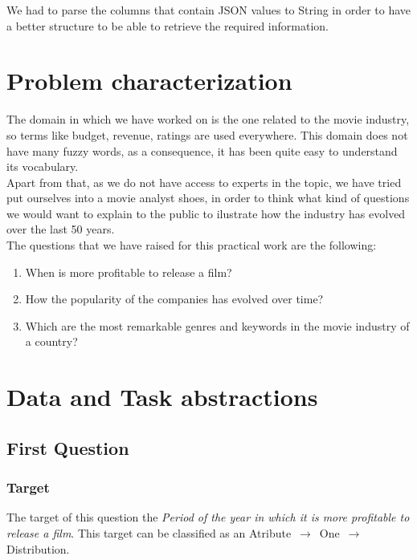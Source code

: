 We had to parse the columns that contain JSON values to String in order to have a better structure to be able to retrieve the required information.

\section{Problem characterization}

The domain in which we have worked on is the one related to the movie industry, so terms like budget, revenue, ratings are used everywhere. This domain does not have many fuzzy words, as a consequence, it has been quite easy to understand its vocabulary.\\

Apart from that, as we do not have access to experts in the topic, we have tried put ourselves into a movie analyst shoes, in order to think what kind of questions we would want to explain to the public to ilustrate how the industry has evolved over the last 50 years.\\

The questions that we have raised for this practical work are the following:

\begin{enumerate}
	\item When is more profitable to release a film?
	\item How the popularity of the companies has evolved over time?
	\item Which are the most remarkable genres and keywords in the movie industry of a country?
\end{enumerate}

\section{Data and Task abstractions}

\subsection{First Question}

\subsubsection{Target}
The target of this question the \textit{Period of the year in which it is more profitable to release a film}. This target can be classified as an Atribute $\,\to\,$ One $\,\to\,$ Distribution.

